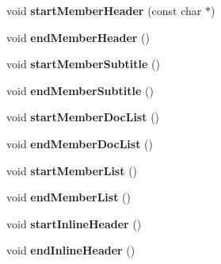 \begin{DoxyCompactItemize}
\item 
\hypertarget{class_html_generator_ae6947537ee279d8d1fe810bc69b3fc7f}{void {\bfseries start\-Member\-Header} (const char $\ast$)}\label{class_html_generator_ae6947537ee279d8d1fe810bc69b3fc7f}

\item 
\hypertarget{class_html_generator_a618c1bfc8806d29116abac6b5817c137}{void {\bfseries end\-Member\-Header} ()}\label{class_html_generator_a618c1bfc8806d29116abac6b5817c137}

\item 
\hypertarget{class_html_generator_a7cf4dbf258928f842c9e96807345bc7a}{void {\bfseries start\-Member\-Subtitle} ()}\label{class_html_generator_a7cf4dbf258928f842c9e96807345bc7a}

\item 
\hypertarget{class_html_generator_a8073c2e7983bc4cd328e4229f51f3bbf}{void {\bfseries end\-Member\-Subtitle} ()}\label{class_html_generator_a8073c2e7983bc4cd328e4229f51f3bbf}

\item 
\hypertarget{class_html_generator_a45f1ccc157c1f0a3797f633881b4945e}{void {\bfseries start\-Member\-Doc\-List} ()}\label{class_html_generator_a45f1ccc157c1f0a3797f633881b4945e}

\item 
\hypertarget{class_html_generator_a1c5248e846cc6987215cd7ae768f7f7c}{void {\bfseries end\-Member\-Doc\-List} ()}\label{class_html_generator_a1c5248e846cc6987215cd7ae768f7f7c}

\item 
\hypertarget{class_html_generator_a951526ac3cd02dd43391d611259ec6ab}{void {\bfseries start\-Member\-List} ()}\label{class_html_generator_a951526ac3cd02dd43391d611259ec6ab}

\item 
\hypertarget{class_html_generator_a71bf3ec847372dc87b57e6fbbdf012ea}{void {\bfseries end\-Member\-List} ()}\label{class_html_generator_a71bf3ec847372dc87b57e6fbbdf012ea}

\item 
\hypertarget{class_html_generator_a427e41a09413570a1c7abf7ee6666385}{void {\bfseries start\-Inline\-Header} ()}\label{class_html_generator_a427e41a09413570a1c7abf7ee6666385}

\item 
\hypertarget{class_html_generator_a0d624d7b38eb45de11d16e311a2cc75b}{void {\bfseries end\-Inline\-Header} ()}\label{class_html_generator_a0d624d7b38eb45de11d16e311a2cc75b}


\end{DoxyCompactItemize}
